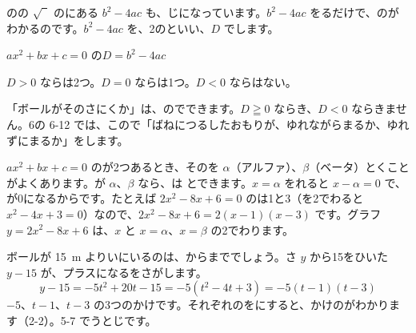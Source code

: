 \medskip
{}のの $\sqrt{\phantom{2}}$ のにある $b^2-4ac$ も、じになっています。$b^2-4ac$ をるだけで、のがわかるのです。$b^2-4ac$ を、2の\textbf{}といい、$D$ でします。

\begin{taisetsu}
$ax^2+bx+c=0$ の\quad $D=b^2-4ac$\par\vspace{2pt}
$D>0$ ならは2つ。$D=0$ ならは1つ。$D<0$ ならはない。
\end{taisetsu}
「ボールがそのさにくか」は、のでできます。$D\geqq0$ ならき、$D<0$ ならきません。6の 6-12 では、こので「ばねにつるしたおもりが、ゆれながらまるか、ゆれずにまるか」をします。

$ax^2+bx+c=0$ のが2つあるとき、そのを $\alpha$（アルファ）、$\beta$（ベータ）とくことがよくあります。が $\alpha$、$\beta$ なら、は
とできます。$x=\alpha$ をれると $x-\alpha=0$ で、が0になるからです。たとえば $2x^2-8x+6=0$ のは1と3（を2でわると $x^2-4x+3=0$）なので、$2x^2-8x+6=2(x-1)(x-3)$ です。グラフ $y=2x^2-8x+6$ は、$x$ と $x=\alpha$、$x=\beta$ の2でわります。

{}


\leavevmode\label{bk:3-10:fugou}ボールが \qty{15}{m} よりいにいるのは、からまででしょう。さ $y$ から15をひいた $y-15$ が、プラスになるをさがします。
\[ y-15=-5t^2+20t-15=-5(t^2-4t+3)=-5(t-1)(t-3) \]
$-5$、$t-1$、$t-3$ の3つのかけです。それぞれのをにすると、かけのがわかります（2-2）。5-7 でうとじです。

